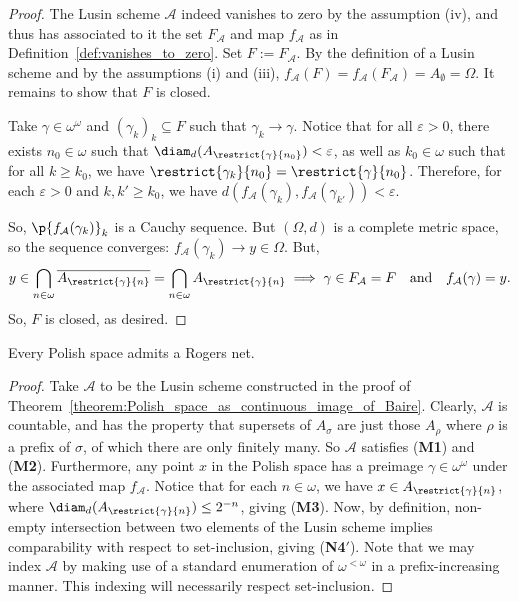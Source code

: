 \begin{proof}
    The Lusin scheme $\mathcal{A}$ indeed vanishes to zero by the assumption (iv), and thus has associated to it the set $F_{\mathcal{A}}$ and map $f_{\mathcal{A}}$ as in Definition~\ref{def:vanishes_to_zero}. Set $F := F_{\mathcal{A}}$. By the definition of a Lusin scheme and by the assumptions (i) and (iii), $f_{\mathcal{A}}(F) = f_{\mathcal{A}}(F_{\mathcal{A}}) = A_{\emptyset} = \Omega$. It remains to show that $F$ is closed. 
    
    Take $\gamma \in \omega^\omega$ and $(\gamma_k)_k \subseteq F$ such that $\gamma_k \to \gamma$. Notice that for all $\varepsilon > 0$, there exists $n_0 \in \omega$ such that $\diam_d(A_{\restrict{\gamma}{n_0}}) < \varepsilon$, as well as $k_0 \in \omega$ such that for all $k \geq k_0$, we have $\restrict{\gamma_{k}}{n_0} = \restrict{\gamma}{n_0}$. Therefore, for each $\varepsilon > 0$ and $k, k' \geq k_0$, 
    we have $d(f_{\mathcal{A}}(\gamma_k), f_{\mathcal{A}}(\gamma_{k'})) < \varepsilon$.
    
    So, $\p{f_{\mathcal{A}}(\gamma_k)}_k$ is a Cauchy sequence. But $(\Omega, d)$ is a complete metric space, so the sequence converges: $f_{\mathcal{A}}(\gamma_k) \to y \in \Omega$. But, 
    \begin{align*}
        y \in \bigcap_{n \in \omega} \overline{A_{\restrict{\gamma}{n}}} = \bigcap_{n \in \omega} A_{\restrict{\gamma}{n}} \implies \gamma \in F_{\mathcal{A}} = F \quad \text{and} \quad f_{\mathcal{A}}(\gamma) = y.
    \end{align*}
    So, $F$ is closed, as desired.
\end{proof}

\begin{corollary}
    Every Polish space admits a Rogers net.
\end{corollary}
\begin{proof}
    Take $\mathcal{A}$ to be the Lusin scheme constructed in the proof of Theorem~\ref{theorem:Polish_space_as_continuous_image_of_Baire}. Clearly, $\mathcal{A}$ is countable, and has the property that supersets of $A_\sigma$ are just those $A_\rho$ where $\rho$ is a prefix of $\sigma$, of which there are only finitely many. So $\mathcal{A}$ satisfies (\textbf{M1}) and (\textbf{M2}). Furthermore, any point $x$ in the Polish space has a preimage $\gamma \in \omega^\omega$ under the associated map $f_{\mathcal{A}}$. Notice that for each $n \in \omega$, we have $x \in A_{\restrict{\gamma}{n}}$, where $\diam_d(A_{\restrict{\gamma}{n}}) \leq 2^{-n}$, giving (\textbf{M3}). Now, by definition, non-empty intersection between two elements of the Lusin scheme implies comparability with respect to set-inclusion, giving (\textbf{N4}$'$). Note that we may index $\mathcal{A}$ by making use of a standard enumeration of $\omega^{<\omega}$ in a prefix-increasing manner. This indexing will necessarily respect set-inclusion.
\end{proof}

